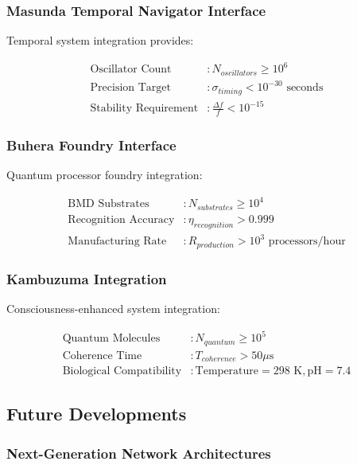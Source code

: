 \subsubsection{Masunda Temporal Navigator Interface}

Temporal system integration provides:

\begin{align}
\text{Oscillator Count} &: N_{oscillators} \geq 10^6 \\
\text{Precision Target} &: \sigma_{timing} < 10^{-30} \text{ seconds} \\
\text{Stability Requirement} &: \frac{\Delta f}{f} < 10^{-15}
\end{align}

\subsubsection{Buhera Foundry Interface}

Quantum processor foundry integration:

\begin{align}
\text{BMD Substrates} &: N_{substrates} \geq 10^4 \\
\text{Recognition Accuracy} &: \eta_{recognition} > 0.999 \\
\text{Manufacturing Rate} &: R_{production} > 10^3 \text{ processors/hour}
\end{align}

\subsubsection{Kambuzuma Integration}

Consciousness-enhanced system integration:

\begin{align}
\text{Quantum Molecules} &: N_{quantum} \geq 10^5 \\
\text{Coherence Time} &: T_{coherence} > 50 \mu\text{s} \\
\text{Biological Compatibility} &: \text{Temperature} = 298 \text{ K}, \text{pH} = 7.4
\end{align}

\subsection{Future Developments}

\subsubsection{Next-Generation Network Architectures}

